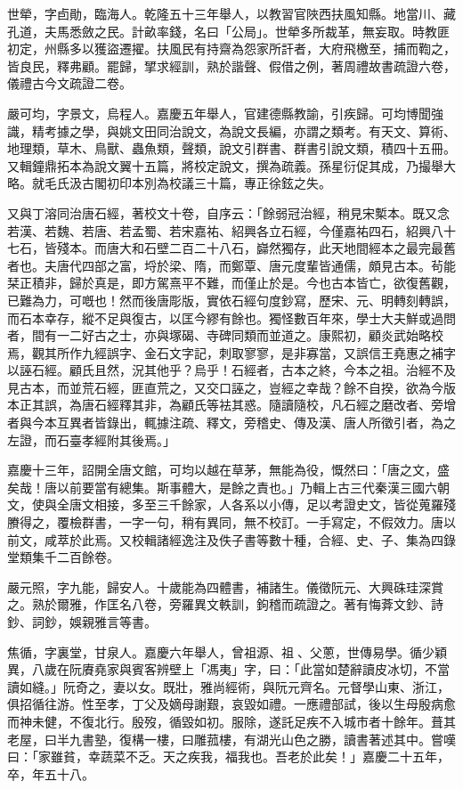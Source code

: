 \begin{pinyinscope}
世犖，字卣勛，臨海人。乾隆五十三年舉人，以教習官陜西扶風知縣。地當川、藏孔道，夫馬悉斂之民。計畝率錢，名曰「公局」。世犖多所裁革，無妄取。時教匪初定，州縣多以獲盜遷擢。扶風民有持齋為怨家所訐者，大府飛檄至，捕而鞫之，皆良民，釋弗顧。罷歸，揅求經訓，熟於諧聲、假借之例，著周禮故書疏證六卷，儀禮古今文疏證二卷。

嚴可均，字景文，烏程人。嘉慶五年舉人，官建德縣教諭，引疾歸。可均博聞強識，精考據之學，與姚文田同治說文，為說文長編，亦謂之類考。有天文、算術、地理類，草木、鳥獸、蟲魚類，聲類，說文引群書、群書引說文類，積四十五冊。又輯鐘鼎拓本為說文翼十五篇，將校定說文，撰為疏義。孫星衍促其成，乃撮舉大略。就毛氏汲古閣初印本別為校議三十篇，專正徐鉉之失。

又與丁溶同治唐石經，著校文十卷，自序云：「餘弱冠治經，稍見宋槧本。既又念若漢、若魏、若唐、若孟蜀、若宋嘉祐、紹興各立石經，今僅嘉祐四石，紹興八十七石，皆殘本。而唐大和石壁二百二十八石，巋然獨存，此天地間經本之最完最舊者也。夫唐代四部之富，埒於梁、隋，而鄭覃、唐元度輩皆通儒，頗見古本。茍能栞正積非，歸於真是，即方駕熹平不難，而僅止於是。今也古本皆亡，欲復舊觀，已難為力，可嘅也！然而後唐彫版，實依石經句度鈔寫，歷宋、元、明轉刻轉誤，而石本幸存，縱不足與復古，以匡今繆有餘也。獨怪數百年來，學士大夫鮮或過問者，間有一二好古之士，亦與塚碣、寺碑同類而並道之。康熙初，顧炎武始略校焉，觀其所作九經誤字、金石文字記，刺取寥寥，是非寡當，又誤信王堯惠之補字以誣石經。顧氏且然，況其他乎？烏乎！石經者，古本之終，今本之祖。治經不及見古本，而並荒石經，匪直荒之，又交口誣之，豈經之幸哉？餘不自揆，欲為今版本正其誤，為唐石經釋其非，為顧氏等袪其惑。隨讀隨校，凡石經之磨改者、旁增者與今本互異者皆錄出，輒據注疏、釋文，旁稽史、傳及漢、唐人所徵引者，為之左證，而石臺孝經附其後焉。」

嘉慶十三年，詔開全唐文館，可均以越在草茅，無能為役，慨然曰：「唐之文，盛矣哉！唐以前要當有總集。斯事體大，是餘之責也。」乃輯上古三代秦漢三國六朝文，使與全唐文相接，多至三千餘家，人各系以小傳，足以考證史文，皆從蒐羅殘賸得之，覆檢群書，一字一句，稍有異同，無不校訂。一手寫定，不假效力。唐以前文，咸萃於此焉。又校輯諸經逸注及佚子書等數十種，合經、史、子、集為四錄堂類集千二百餘卷。

嚴元照，字九能，歸安人。十歲能為四體書，補諸生。儀徵阮元、大興硃珪深賞之。熟於爾雅，作匡名八卷，旁羅異文軼訓，鉤稽而疏證之。著有悔葊文鈔、詩鈔、詞鈔，娛親雅言等書。

焦循，字裏堂，甘泉人。嘉慶六年舉人，曾祖源、祖、父蔥，世傳易學。循少穎異，八歲在阮賡堯家與賓客辨壁上「馮夷」字，曰：「此當如楚辭讀皮冰切，不當讀如縫。」阮奇之，妻以女。既壯，雅尚經術，與阮元齊名。元督學山東、浙江，俱招循往游。性至孝，丁父及嫡母謝艱，哀毀如禮。一應禮部試，後以生母殷病愈而神未健，不復北行。殷歿，循毀如初。服除，遂託足疾不入城市者十餘年。葺其老屋，曰半九書塾，復構一樓，曰雕菰樓，有湖光山色之勝，讀書著述其中。嘗嘆曰：「家雖貧，幸蔬菜不乏。天之疾我，福我也。吾老於此矣！」嘉慶二十五年，卒，年五十八。


\end{pinyinscope}
